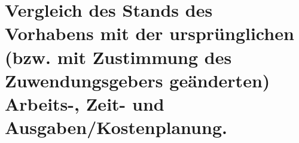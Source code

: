 \section{Vergleich des Stands des Vorhabens mit der ursprünglichen (bzw. mit Zustimmung des Zuwendungsgebers geänderten) Arbeits-, Zeit- und Ausgaben/Kostenplanung.}
